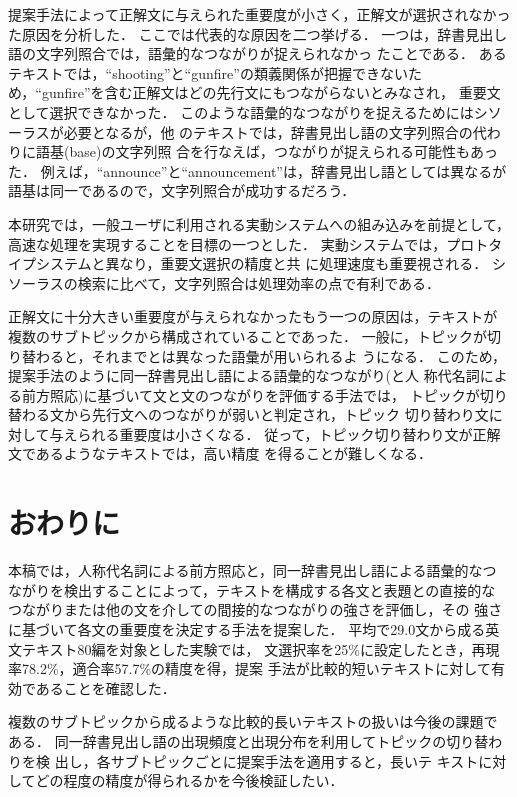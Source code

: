 提案手法によって正解文に与えられた重要度が小さく，正解文が選択されなかっ
た原因を分析した．
ここでは代表的な原因を二つ挙げる．
一つは，辞書見出し語の文字列照合では，語彙的なつながりが捉えられなかっ
たことである．
あるテキストでは，``shooting''と``gunfire''の類義関係が把握できないた
め，``gunfire''を含む正解文はどの先行文にもつながらないとみなされ，
重要文として選択できなかった．
このような語彙的なつながりを捉えるためにはシソーラスが必要となるが，他
のテキストでは，辞書見出し語の文字列照合の代わりに語基(base)の文字列照
合を行なえば，つながりが捉えられる可能性もあった．
例えば，``announce''と``announcement''は，辞書見出し語としては異なるが
語基は同一であるので，文字列照合が成功するだろう．

本研究では，一般ユーザに利用される実動システムへの組み込みを前提として，
高速な処理を実現することを目標の一つとした．
実動システムでは，プロトタイプシステムと異なり，重要文選択の精度と共
に処理速度も重要視される．
シソーラスの検索に比べて，文字列照合は処理効率の点で有利である．

正解文に十分大きい重要度が与えられなかったもう一つの原因は，テキストが
複数のサブトピックから構成されていることであった．
一般に，トピックが切り替わると，それまでとは異なった語彙が用いられるよ
うになる．
このため，提案手法のように同一辞書見出し語による語彙的なつながり(と人
称代名詞による前方照応)に基づいて文と文のつながりを評価する手法では，
トピックが切り替わる文から先行文へのつながりが弱いと判定され，トピック
切り替わり文に対して与えられる重要度は小さくなる．
従って，トピック切り替わり文が正解文であるようなテキストでは，高い精度
を得ることが難しくなる．

\section{おわりに}

本稿では，人称代名詞による前方照応と，同一辞書見出し語による語彙的なつ
ながりを検出することによって，テキストを構成する各文と表題との直接的な
つながりまたは他の文を介しての間接的なつながりの強さを評価し，その
強さに基づいて各文の重要度を決定する手法を提案した．
平均で29.0文から成る英文テキスト80編を対象とした実験では，
文選択率を25\%に設定したとき，再現率78.2\%，適合率57.7\%の精度を得，提案
手法が比較的短いテキストに対して有効であることを確認した．

複数のサブトピックから成るような比較的長いテキストの扱いは今後の課題で
ある．
同一辞書見出し語の出現頻度と出現分布を利用してトピックの切り替わりを検
出し\cite{Hearst97}，各サブトピックごとに提案手法を適用すると，長いテ
キストに対してどの程度の精度が得られるかを今後検証したい．


